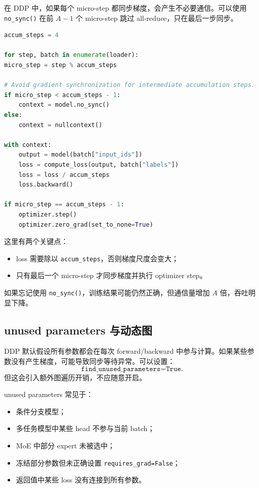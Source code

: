 在 DDP 中，如果每个 micro-step 都同步梯度，会产生不必要通信。可以使用 \texttt{no_sync()} 在前 $A-1$ 个 micro-step 跳过 all-reduce，只在最后一步同步。

\begin{lstlisting}[language=Python,caption={DDP 中使用 no_sync 做梯度累积},label={lst:ddp-no-sync-gradient-accumulation}]
accum_steps = 4

for step, batch in enumerate(loader):
micro_step = step % accum_steps

# Avoid gradient synchronization for intermediate accumulation steps.
if micro_step < accum_steps - 1:
    context = model.no_sync()
else:
    context = nullcontext()

with context:
    output = model(batch["input_ids"])
    loss = compute_loss(output, batch["labels"])
    loss = loss / accum_steps
    loss.backward()

if micro_step == accum_steps - 1:
    optimizer.step()
    optimizer.zero_grad(set_to_none=True)

\end{lstlisting}

这里有两个关键点：

\begin{itemize}
\item loss 需要除以 \texttt{accum_steps}，否则梯度尺度会变大；
\item 只有最后一个 micro-step 才同步梯度并执行 optimizer step。
\end{itemize}

如果忘记使用 \texttt{no_sync()}，训练结果可能仍然正确，但通信量增加 $A$ 倍，吞吐明显下降。

\subsection{unused parameters 与动态图}
\label{subsec:unused-parameters-and-dynamic-graph}

DDP 默认假设所有参数都会在每次 forward/backward 中参与计算。如果某些参数没有产生梯度，可能导致同步等待异常。可以设置：
\[
\texttt{find_unused_parameters=True}.
\]
但这会引入额外图遍历开销，不应随意开启。

unused parameters 常见于：

\begin{itemize}
\item 条件分支模型；
\item 多任务模型中某些 head 不参与当前 batch；
\item MoE 中部分 expert 未被选中；
\item 冻结部分参数但未正确设置 \texttt{requires_grad=False}；
\item 返回值中某些 loss 没有连接到所有参数。
\end{itemize}

